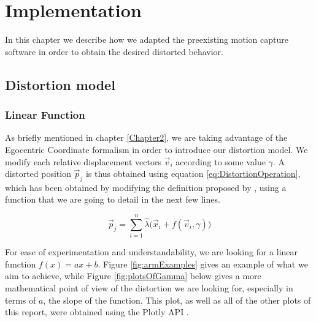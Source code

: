 
\chapter{Implementation} %

\label{Chapter3} %

In this chapter we describe how we adapted the preexisting motion capture software in order to obtain the desired distorted behavior.

\section{Distortion model}

\subsection*{Linear Function}

As briefly mentioned in chapter \ref{Chapter2}, we are taking advantage of the Egocentric Coordinate formalism in order to introduce our distortion model. We modify each relative displacement vectors $\vec{v}_i$ according to some value $\gamma$. A distorted position $\vec{p}_j$ is thus obtained using equation \ref{eq:DistortionOperation}, which has been obtained by modifying the definition proposed by \cite{molla2017egocentric}, using a function that we are going to detail in the next few lines.

\begin{equation}
\label{eq:DistortionOperation}
\vec{p}_j = \displaystyle\sum_{i=1}^{n} \hat{\lambda}\big(\vec{x}_i + f(\vec{v}_i,\gamma )\big)
\end{equation}

\noindent
For ease of experimentation and understandability, we are looking for a linear function $f(x) = ax + b$. Figure \ref{fig:armExamples} gives an example of what we aim to achieve, while Figure \ref{fig:plotsOfGamma} below gives a more mathematical point of view of the distortion we are looking for, especially in terms of $a$, the slope of the function. This plot, as well as all of the other plots of this report, were obtained using the Plotly API \cite{plotly}.

